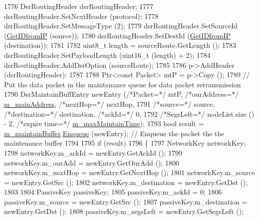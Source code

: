 \begin{DoxyCode}
1776           DsrRoutingHeader dsrRoutingHeader;
1777           dsrRoutingHeader.SetNextHeader (protocol);
1778           dsrRoutingHeader.SetMessageType (2);
1779           dsrRoutingHeader.SetSourceId (\hyperlink{classns3_1_1dsr_1_1DsrRouting_a4593e50d5f36e9b9b013fe0422067c44}{GetIDfromIP} (source));
1780           dsrRoutingHeader.SetDestId (\hyperlink{classns3_1_1dsr_1_1DsrRouting_a4593e50d5f36e9b9b013fe0422067c44}{GetIDfromIP} (destination));
1781 
1782           uint8\_t length = sourceRoute.GetLength ();
1783           dsrRoutingHeader.SetPayloadLength (uint16\_t (length) + 2);
1784           dsrRoutingHeader.AddDsrOption (sourceRoute);
1785 
1786           p->AddHeader (dsrRoutingHeader);
1787 
1788           Ptr<const Packet> mtP = p->Copy ();
1789           \textcolor{comment}{// Put the data packet in the maintenance queue for data packet retransmission}
1790           DsrMaintainBuffEntry newEntry (\textcolor{comment}{/*Packet=*/} mtP, \textcolor{comment}{/*ourAddress=*/} 
      \hyperlink{classns3_1_1dsr_1_1DsrRouting_a73182b5edee2d8460f28855e058fc9a0}{m\_mainAddress}, \textcolor{comment}{/*nextHop=*/} nextHop,
1791                                       \textcolor{comment}{/*source=*/} source, \textcolor{comment}{/*destination=*/} destination, \textcolor{comment}{/*ackId=*/} 0,
1792                                       \textcolor{comment}{/*SegsLeft=*/} nodeList.size () - 2, \textcolor{comment}{/*expire time=*/} 
      \hyperlink{classns3_1_1dsr_1_1DsrRouting_ac6b1dffa9665af0d6a71aa7b947962ee}{m\_maxMaintainTime});
1793           \textcolor{keywordtype}{bool} result = \hyperlink{classns3_1_1dsr_1_1DsrRouting_ac9d28a64437fbe20a4228c9811f9fc27}{m\_maintainBuffer}.\hyperlink{classns3_1_1dsr_1_1DsrMaintainBuffer_a8ec30b5b9b0f6af36e61867327a47717}{Enqueue} (newEntry);       \textcolor{comment}{// Enqueue the
       packet the the maintenance buffer}
1794 
1795           \textcolor{keywordflow}{if} (result)
1796             \{
1797               NetworkKey networkKey;
1798               networkKey.m\_ackId = newEntry.GetAckId ();
1799               networkKey.m\_ourAdd = newEntry.GetOurAdd ();
1800               networkKey.m\_nextHop = newEntry.GetNextHop ();
1801               networkKey.m\_source = newEntry.GetSrc ();
1802               networkKey.m\_destination = newEntry.GetDst ();
1803 
1804               PassiveKey passiveKey;
1805               passiveKey.m\_ackId = 0;
1806               passiveKey.m\_source = newEntry.GetSrc ();
1807               passiveKey.m\_destination = newEntry.GetDst ();
1808               passiveKey.m\_segsLeft = newEntry.GetSegsLeft ();

\end{DoxyCode}
